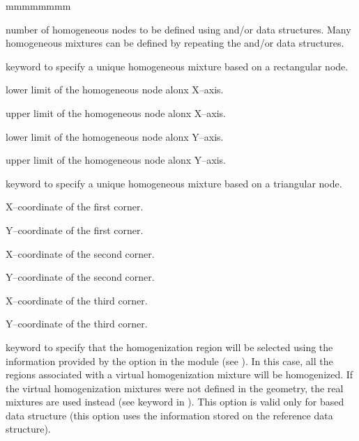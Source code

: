 \begin{ListeDeDescription}{mmmmmmmm}
\item[\dusa{nhom}] number of homogeneous nodes to be defined using  and/or  data structures. Many homogeneous mixtures can be defined by
repeating the  and/or  data structures.

\item[\moc{RECT}] keyword to specify a unique homogeneous mixture based on a rectangular node. 

\item[\dusa{xm}] lower limit of the homogeneous node alonx X--axis.

\item[\dusa{xp}] upper limit of the homogeneous node alonx X--axis.

\item[\dusa{ym}] lower limit of the homogeneous node alonx Y--axis.

\item[\dusa{yp}] upper limit of the homogeneous node alonx Y--axis.

\item[\moc{TRIA}] keyword to specify a unique homogeneous mixture based on a triangular node.

\item[\dusa{x1}] X--coordinate of the first corner.

\item[\dusa{y1}] Y--coordinate of the first corner.

\item[\dusa{x2}] X--coordinate of the second corner.

\item[\dusa{y2}] Y--coordinate of the second corner.

\item[\dusa{x3}] X--coordinate of the third corner.

\item[\dusa{y3}] Y--coordinate of the third corner.

\item[\moc{HMIX}] keyword to specify that the homogenization region will be selected using the information provided by the  option in the  module (see ). In this case, all the regions associated with a virtual homogenization mixture will be homogenized. If the virtual homogenization mixtures were not defined in the geometry, the real mixtures are used instead (see  keyword in ). This option is valid only for  based  data structure (this option uses the information stored on the reference  data structure).


\end{ListeDeDescription}
